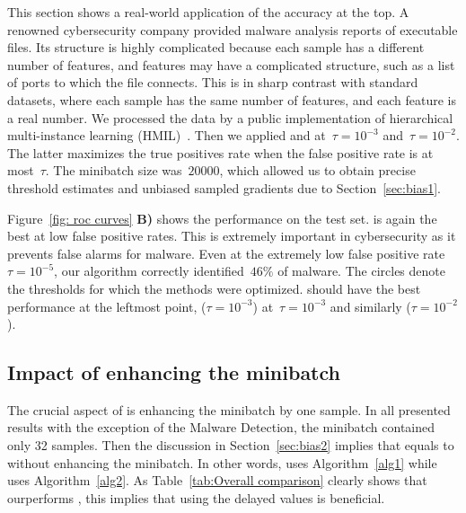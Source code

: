 This section shows a real-world application of the accuracy at the top. A renowned cybersecurity company provided malware analysis reports of executable files. Its structure is highly complicated because each sample has a different number of features, and features may have a complicated structure, such as a list of ports to which the file connects. This is in sharp contrast with standard datasets, where each sample has the same number of features, and each feature is a real number. We processed the data by a public implementation of hierarchical multi-instance learning (HMIL)~\cite{pevny2017using}. Then we applied \DeepTopPush and \PatMatNP at~$\tau=10^{-3}$ and~$\tau=10^{-2}$. The latter maximizes the true positives rate when the false positive rate is at most~$\tau$. The minibatch size was~$20000$, which allowed us to obtain precise threshold estimates and unbiased sampled gradients due to Section~\ref{sec:bias1}.

Figure~\ref{fig: roc curves} \textbf{B)} shows the performance on the test set. \DeepTopPush is again the best at low false positive rates. This is extremely important in cybersecurity as it prevents false alarms for malware. Even at the extremely low false positive rate~$\tau=10^{-5}$, our algorithm correctly identified~$46\%$ of malware. The circles denote the thresholds for which the methods were optimized. \DeepTopPush should have the best performance at the leftmost point, \PatMatNP ($\tau=10^{-3}$) at~$\tau=10^{-3}$ and similarly \PatMatNP($\tau=10^{-2}$).

\subsection{Impact of enhancing the minibatch}\label{sec:delay}

The crucial aspect of \DeepTopPush is enhancing the minibatch by one sample. In all presented results with the exception of the Malware Detection, the minibatch contained only 32 samples. Then the discussion in Section~\ref{sec:bias2} implies that \PatMatNP equals to \DeepTopPush without enhancing the minibatch. In other words, \PatMatNP uses Algorithm~\ref{alg1} while \DeepTopPush uses Algorithm~\ref{alg2}. As Table~\ref{tab:Overall comparison} clearly shows that \DeepTopPush ourperforms \PatMatNP, this implies that using the delayed values is beneficial.

